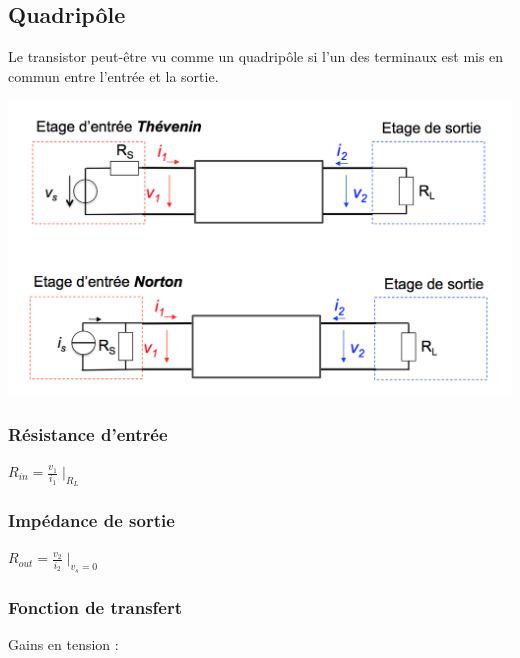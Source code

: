 \documentclass[]{article}
\begin{document}
\subsection{Quadripôle}
Le transistor peut-être vu comme un quadripôle si l'un des terminaux est mis en commun entre l'entrée et la sortie.

\includegraphics[scale=0.6]{quad}
\subsubsection{Résistance d'entrée}
$ R_{in} = \frac{v_1}{i_1}\mid_{R_L} $
\subsubsection{Impédance de sortie}
$ R_{out} = \frac{v_2}{i_2}\mid_{v_s=0} $
\subsubsection{Fonction de transfert}
Gains en tension :
\end{document}
